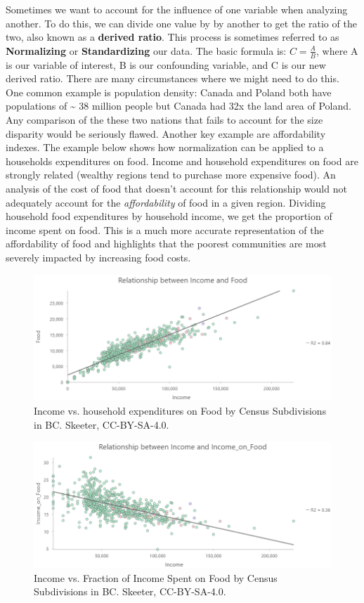 \documentclass[
]{book}
\begin{document}
Sometimes we want to account for the influence of one variable when analyzing another. To do this, we can divide one value by by another to get the ratio of the two, also known as a \textbf{derived ratio}. This process is sometimes referred to as \textbf{Normalizing} or \textbf{Standardizing} our data. The basic formula is: \(C=\frac{A}{B}\), where A is our variable of interest, B is our confounding variable, and C is our new derived ratio. There are many circumstances where we might need to do this. One common example is population density: Canada and Poland both have populations of \textasciitilde{} 38 million people but Canada had 32x the land area of Poland. Any comparison of the these two nations that fails to account for the size disparity would be seriously flawed. Another key example are affordability indexes. The example below shows how normalization can be applied to a households expenditures on food. Income and household expenditures on food are strongly related (wealthy regions tend to purchase more expensive food). An analysis of the cost of food that doesn't account for this relationship would not adequately account for the \emph{affordability} of food in a given region. Dividing household food expenditures by household income, we get the proportion of income spent on food. This is a much more accurate representation of the affordability of food and highlights that the poorest communities are most severely impacted by increasing food costs.

\begin{figure}
\includegraphics[width=0.75\linewidth]{images/03-income-v-food} \caption{Income vs. household expenditures on Food by Census Subdivisions in BC. Skeeter, CC-BY-SA-4.0.}\label{fig:3-income-v-food}
\end{figure}

\begin{figure}
\includegraphics[width=0.75\linewidth]{images/03-income-v-income-on-food} \caption{Income vs. Fraction of Income Spent on Food by Census Subdivisions in BC. Skeeter, CC-BY-SA-4.0.}\label{fig:3-income-v-income-on-food}
\end{figure}
\end{document}
